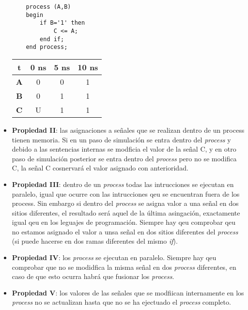 \begin{itemize}
\vspace*{1em}
    

\begin{minipage}{0.47\linewidth} \centering
    \begin{lstlisting}
    process (A,B)
    begin
        if B='1' then
            C <= A;
        end if;
    end process;
    \end{lstlisting}
\end{minipage}\hfill
\begin{minipage}{0.47\linewidth} \centering
    \begin{tabular}{|c|c|c|c|}
    \hline
    \textbf{t} & \textbf{0 ns} & \textbf{5 ns} & \textbf{10 ns} \\
    \hline
    \textbf{A} & 0 & 0 & 1 \\
    \hline
    \textbf{B} & 0 & 1 & 1 \\
    \hline
    \textbf{C} & U & 1 & 1 \\
    \hline
    \end{tabular}
\end{minipage}

    \item \textbf{Propiedad II}: las asignaciones a señales que se realizan dentro de un process tienen memoria. Si en un paso de simulación se entra dentro del \textit{process} y debido a las sentencias internas se modficia el valor de la señal C, y en otro paso de simulación posterior se entra dentro del \textit{process} pero no se modifica C, la señal C cosnervará el valor asignado con anterioridad. 
    \item \textbf{Propiedad III}: dentro de un \textit{process} todas las intrucciones se ejecutan en paralelo, igual que ocurre con las intrucciones qeu se encuentran fuera de los process. Sin embargo si dentro del \textit{process} se asigna valor a una señal en dos sitios diferentes, el resultado será aquel de la última asingación, exactamente igual qeu en los leguajes de programación. Siempre hay qeu comprobar qeu no estamos asignado el valor a unsa señal en dos sitios diferentes del \textit{process} (si puede hacerse en dos ramas diferentes del mismo \textit{if}).
    \item \textbf{Propiedad IV}: los \textit{process} se ejecutan en paralelo. Siempre hay qeu comprobar que no se modidfica la misma señal en dos \textit{process} diferentes, en caso de que esto ocurra habrá que fusionar los  \textit{process}. 
    \item \textbf{Propiedad V}: los valores de las señales que se modfiican internamente en los \textit{process} no se actualizan hasta que no se ha ejectuado el \textit{process} completo.
\end{itemize}

